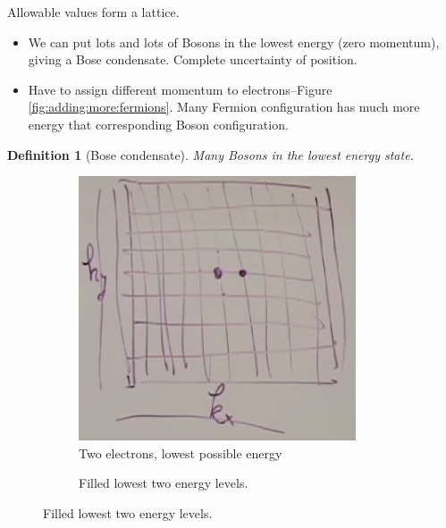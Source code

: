 \documentclass[]{article}
\newtheorem{defn}[thm]{Definition}
\begin{document}
Allowable values form a lattice.
\begin{itemize}
	\item We can put lots and lots of Bosons in the lowest energy (zero momentum), giving a Bose condensate. Complete uncertainty of position.
	\item Have to assign different momentum to electrons--Figure \ref{fig:adding:more:fermions}. Many Fermion configuration has much more energy that corresponding Boson configuration. 
\end{itemize}

\begin{defn}[Bose condensate]
	Many Bosons in the lowest energy  state.
\end{defn}

\begin{figure}[H]
	\caption{Adding more Fermions}\label{fig:adding:more:fermions}
	\begin{subfigure}{0.32\textwidth}
		\caption{Two electrons, lowest possible energy}\label{fig:electons:lowest:energy}
		\includegraphics[width=0.9\textwidth]{electons-lowest-energy}
	\end{subfigure}
	\begin{subfigure}{0.32\textwidth}
		\caption{Filled lowest two energy levels.}

\end{subfigure}
\end{figure}
\end{document}
